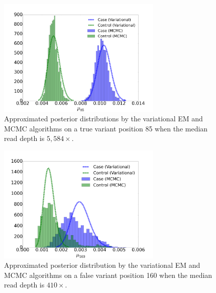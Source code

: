 \documentclass{bmcart}
\begin{document}
\begin{figure}[htbp]
\centering
\includegraphics[width=0.7\textwidth]{fig1.png}
\caption{Approximated posterior distributions by the variational EM and MCMC algorithms on a true variant position 85 when the median read depth is $5,584\times$.}\label{figure:compare1}
\end{figure}
\begin{figure}[htbp]
\centering
\includegraphics[width=0.7\textwidth]{fig2.png}
\caption{Approximated posterior distribution by the variational EM and MCMC algorithms on a false variant position 160 when the median read depth is $410\times$.}\label{figure:compare2}
\end{figure}
\end{document}
